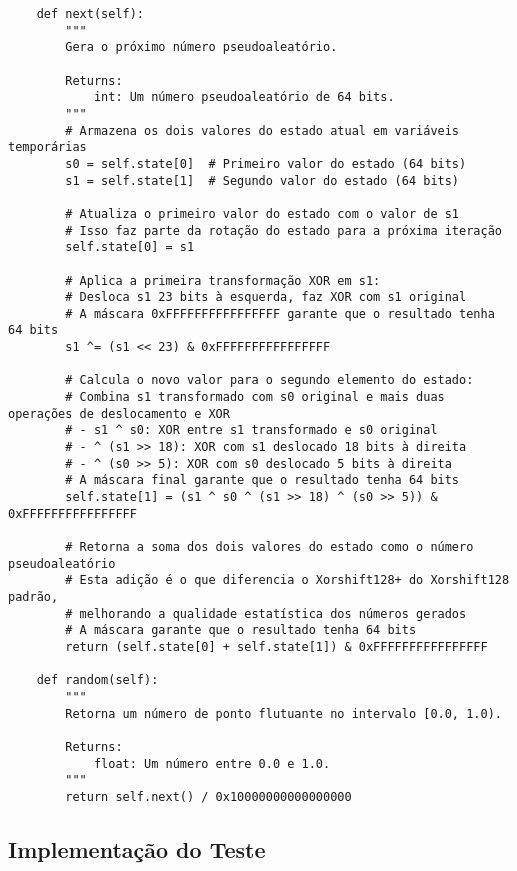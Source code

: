 \begin{verbatim}
    def next(self):
        """
        Gera o próximo número pseudoaleatório.
        
        Returns:
            int: Um número pseudoaleatório de 64 bits.
        """
        # Armazena os dois valores do estado atual em variáveis temporárias
        s0 = self.state[0]  # Primeiro valor do estado (64 bits)
        s1 = self.state[1]  # Segundo valor do estado (64 bits)
        
        # Atualiza o primeiro valor do estado com o valor de s1
        # Isso faz parte da rotação do estado para a próxima iteração
        self.state[0] = s1
        
        # Aplica a primeira transformação XOR em s1:
        # Desloca s1 23 bits à esquerda, faz XOR com s1 original
        # A máscara 0xFFFFFFFFFFFFFFFF garante que o resultado tenha 64 bits
        s1 ^= (s1 << 23) & 0xFFFFFFFFFFFFFFFF
        
        # Calcula o novo valor para o segundo elemento do estado:
        # Combina s1 transformado com s0 original e mais duas operações de deslocamento e XOR
        # - s1 ^ s0: XOR entre s1 transformado e s0 original
        # - ^ (s1 >> 18): XOR com s1 deslocado 18 bits à direita
        # - ^ (s0 >> 5): XOR com s0 deslocado 5 bits à direita
        # A máscara final garante que o resultado tenha 64 bits
        self.state[1] = (s1 ^ s0 ^ (s1 >> 18) ^ (s0 >> 5)) & 0xFFFFFFFFFFFFFFFF
        
        # Retorna a soma dos dois valores do estado como o número pseudoaleatório
        # Esta adição é o que diferencia o Xorshift128+ do Xorshift128 padrão,
        # melhorando a qualidade estatística dos números gerados
        # A máscara garante que o resultado tenha 64 bits
        return (self.state[0] + self.state[1]) & 0xFFFFFFFFFFFFFFFF
    
    def random(self):
        """
        Retorna um número de ponto flutuante no intervalo [0.0, 1.0).
        
        Returns:
            float: Um número entre 0.0 e 1.0.
        """
        return self.next() / 0x10000000000000000
\end{verbatim}

\subsection{Implementação do Teste}

